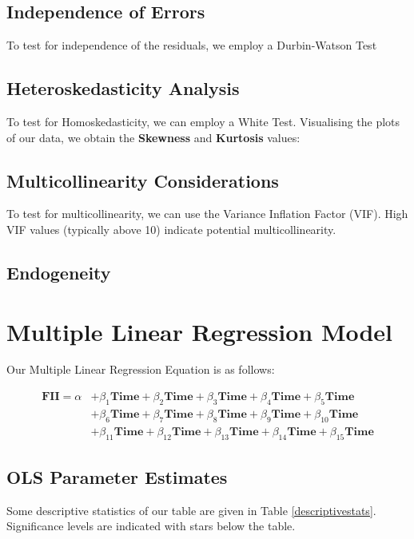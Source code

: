 \documentclass{article}
\begin{document}
\subsection{Independence of Errors}
To test for independence of the residuals, we employ a Durbin-Watson Test 

\subsection{Heteroskedasticity Analysis}
To test for Homoskedasticity, we can employ a White Test. Visualising the plots of our data, we obtain the \textbf{Skewness} and \textbf{Kurtosis} values: 

\subsection{Multicollinearity Considerations}
To test for multicollinearity, we can use the Variance Inflation Factor (VIF). High VIF values (typically above 10) indicate potential multicollinearity.

\subsection{Endogeneity}

\section{Multiple Linear Regression Model}

Our Multiple Linear Regression Equation is as follows: 

\begin{equation}
    \begin{aligned}
        \mathbf{FII} = \alpha & + \beta_1\mathbf{Time} + \beta_2\mathbf{Time} + \beta_3\mathbf{Time} + \beta_4\mathbf{Time} + \beta_5\mathbf{Time} \\ 
        & + \beta_6\mathbf{Time} + \beta_7\mathbf{Time} + \beta_8\mathbf{Time} + \beta_9\mathbf{Time} + \beta_10\mathbf{Time} \\
        & + \beta_{11}\mathbf{Time} + \beta_{12}\mathbf{Time} + \beta_{13}\mathbf{Time} + \beta_{14}\mathbf{Time} + \beta_{15}\mathbf{Time}
    \end{aligned}
\end{equation}

\subsection{OLS Parameter Estimates}
Some descriptive statistics of our table are given in Table \ref{descriptivestats}. Significance levels are indicated with stars below the table. 
\end{document}
